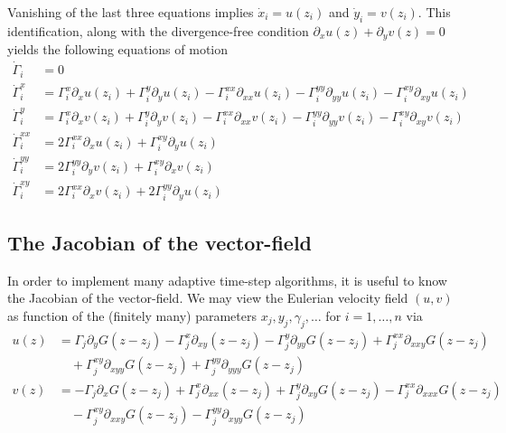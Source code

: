 \documentclass[12pt]{amsart}
\begin{document}
Vanishing of the last three equations implies $\dot{x}_i = u(z_i)$ and $\dot{y}_i = v(z_i)$.  This identification, along with the divergence-free condition $\partial_x u(z) + \partial_yv(z) = 0$ yields the following equations of motion
\begin{align*}
	\dot{\Gamma}_i &= 0 \\
	\dot{\Gamma}_i^x &= \Gamma_i^x \partial_xu(z_i) + \Gamma_i^y \partial_y u(z_i) - \Gamma_i^{xx} \partial_{xx} u(z_i) - \Gamma_i^{yy} \partial_{yy}u(z_i) - \Gamma_i^{xy} \partial_{xy} u(z_i) \\
	\dot{\Gamma}_i^y &= \Gamma_i^x \partial_xv(z_i) + \Gamma_i^y \partial_y v(z_i) - \Gamma_i^{xx} \partial_{xx} v(z_i) - \Gamma_i^{yy} \partial_{yy}v(z_i) - \Gamma_i^{xy} \partial_{xy} v(z_i) \\
	\dot{\Gamma}_i^{xx} &= 2 \Gamma_i^{xx} \partial_x u(z_i) + \Gamma_i^{xy} \partial_y u(z_i) \\
	\dot{\Gamma}_i^{yy} &= 2 \Gamma_i^{yy} \partial_y v(z_i) + \Gamma_i^{xy} \partial_x v(z_i) \\
	\dot{\Gamma}_i^{xy} &= 2 \Gamma_i^{xx} \partial_x v(z_i) + 2 \Gamma_i^{yy} \partial_y u(z_i)
\end{align*}

\subsection{The Jacobian of the vector-field}
In order to implement many adaptive time-step algorithms, it is useful
to know the Jacobian of the vector-field.
We may view the Eulerian velocity field $(u,v)$ as function of the (finitely many) parameters $x_j,y_j,\gamma_j,\dots$ for $i=1,\dots,n$ via
\begin{align*}
  u(z) &= \Gamma_j \partial_y G(z-z_j) - \Gamma_j^x \partial_{xy}(z-z_j)
  - \Gamma_j^y \partial_{yy}G(z-z_j) + \Gamma_j^{xx} \partial_{xxy}G(z-z_j) \\
  &\quad+ \Gamma_j^{xy} \partial_{xyy}G(z-z_j) + \Gamma_j^{yy} \partial_{yyy} G(z-z_j) \\
  v(z) &= -\Gamma_j \partial_x G(z-z_j) + \Gamma_j^x \partial_{xx}(z-z_j)
  + \Gamma_j^y \partial_{xy}G(z-z_j) - \Gamma_j^{xx} \partial_{xxx}G(z-z_j) \\
  &\quad - \Gamma_j^{xy} \partial_{xxy}G(z-z_j) - \Gamma_j^{yy} \partial_{xyy} G(z-z_j)
\end{align*}
\end{document}
